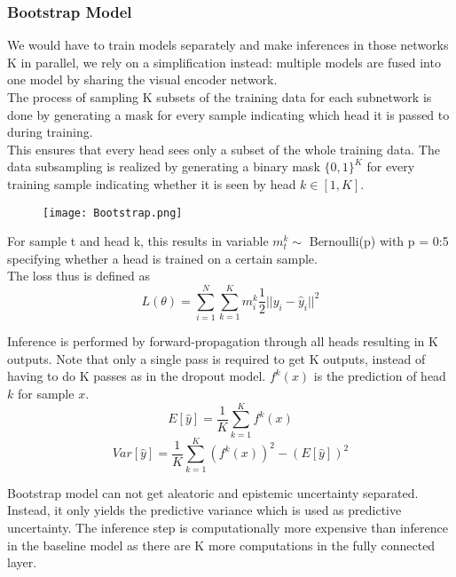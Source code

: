 \documentclass{article}
\begin{document}
\subsubsection{Bootstrap Model}
We would have to train models separately and make inferences in those networks K in parallel, we rely on a simplification instead: multiple models are fused into one model by sharing the visual encoder network.\\

\noindent The process of sampling K subsets of the training data for each subnetwork is done by generating a mask for every sample indicating which head it is passed to during training.\\

\noindent This ensures that every head sees only a subset of the whole training data. The data subsampling is realized by generating a binary mask $\{0, 1\}^K$ for every training sample indicating whether it is seen by head $k \in [1, K]$.\\

\begin{figure}[ht]
\texttt{[image: Bootstrap.png]}
\end{figure}

\noindent For sample t and head k, this results in variable $m^{k}_t\sim$ Bernoulli(p) with p = 0:5 specifying whether a head is trained on a certain sample.\\

\noindent The loss thus is defined as
\[L(\theta)=\sum_{i=1}^{N}\sum_{k=1}^{K}m^k_i\frac{1}{2}||y_i-\hat{y}_i||^2\]

\noindent Inference is performed by forward-propagation through all heads resulting in K outputs. Note that only a single pass is required to get K outputs, instead of having to do K passes as in the dropout model. $f^k(x)$ is the prediction of head $k$ for sample $x$. 
\[E[\hat{y}]=\frac{1}{K}\sum_{k=1}^{K}f^k(x)\]
\[Var[\hat{y}]=\frac{1}{K}\sum_{k=1}^{K}(f^k(x))^2-(E[\hat{y}])^{2}\]

\noindent Bootstrap model can not get aleatoric and epistemic uncertainty separated. Instead, it only yields the predictive variance which is used as predictive uncertainty. The inference step is computationally more expensive than inference in the baseline model as there are K more computations in the fully connected layer.
\end{document}
